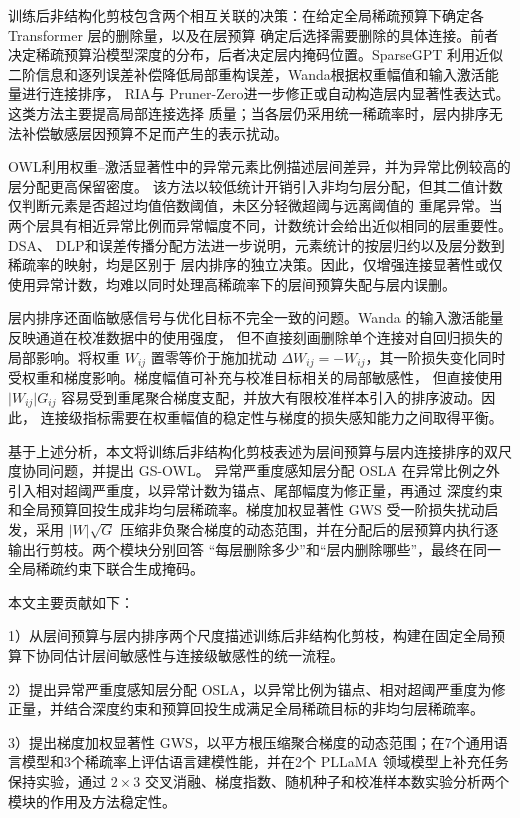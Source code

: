\documentclass[UTF8,fontset=fandol]{ctexart}
\newcommand{\method}{GS-OWL}
\begin{document}
训练后非结构化剪枝包含两个相互关联的决策：在给定全局稀疏预算下确定各 Transformer 层的删除量，以及在层预算
确定后选择需要删除的具体连接。前者决定稀疏预算沿模型深度的分布，后者决定层内掩码位置。SparseGPT\cite{sparsegpt}
利用近似二阶信息和逐列误差补偿降低局部重构误差，Wanda\cite{wanda}根据权重幅值和输入激活能量进行连接排序，
RIA\cite{ria}与 Pruner-Zero\cite{prunerzero}进一步修正或自动构造层内显著性表达式。这类方法主要提高局部连接选择
质量；当各层仍采用统一稀疏率时，层内排序无法补偿敏感层因预算不足而产生的表示扰动。

OWL\cite{owl}利用权重--激活显著性中的异常元素比例描述层间差异，并为异常比例较高的层分配更高保留密度。
该方法以较低统计开销引入非均匀层分配，但其二值计数仅判断元素是否超过均值倍数阈值，未区分轻微超阈与远离阈值的
重尾异常。当两个层具有相近异常比例而异常幅度不同，计数统计会给出近似相同的层重要性。DSA\cite{dsa}、
DLP\cite{dlp}和误差传播分配方法\cite{atp}进一步说明，元素统计的按层归约以及层分数到稀疏率的映射，均是区别于
层内排序的独立决策。因此，仅增强连接显著性或仅使用异常计数，均难以同时处理高稀疏率下的层间预算失配与层内误删。

层内排序还面临敏感信号与优化目标不完全一致的问题。Wanda 的输入激活能量反映通道在校准数据中的使用强度，
但不直接刻画删除单个连接对自回归损失的局部影响。将权重 $W_{ij}$ 置零等价于施加扰动
$\Delta W_{ij}=-W_{ij}$，其一阶损失变化同时受权重和梯度影响。梯度幅值可补充与校准目标相关的局部敏感性，
但直接使用 $\lvert W_{ij}\rvert G_{ij}$ 容易受到重尾聚合梯度支配，并放大有限校准样本引入的排序波动。因此，
连接级指标需要在权重幅值的稳定性与梯度的损失感知能力之间取得平衡。

基于上述分析，本文将训练后非结构化剪枝表述为层间预算与层内连接排序的双尺度协同问题，并提出 \method。
异常严重度感知层分配 OSLA 在异常比例之外引入相对超阈严重度，以异常计数为锚点、尾部幅度为修正量，再通过
深度约束和全局预算回投生成非均匀层稀疏率。梯度加权显著性 GWS 受一阶损失扰动启发，采用
$\lvert W\rvert\sqrt{G}$ 压缩非负聚合梯度的动态范围，并在分配后的层预算内执行逐输出行剪枝。两个模块分别回答
“每层删除多少”和“层内删除哪些”，最终在同一全局稀疏约束下联合生成掩码。

本文主要贡献如下：

1）从层间预算与层内排序两个尺度描述训练后非结构化剪枝，构建在固定全局预算下协同估计层间敏感性与连接级敏感性的统一流程。

2）提出异常严重度感知层分配 OSLA，以异常比例为锚点、相对超阈严重度为修正量，并结合深度约束和预算回投生成满足全局稀疏目标的非均匀层稀疏率。

3）提出梯度加权显著性 GWS，以平方根压缩聚合梯度的动态范围；在7个通用语言模型和3个稀疏率上评估语言建模性能，并在2个 PLLaMA 领域模型上补充任务保持实验，通过 $2\times3$ 交叉消融、梯度指数、随机种子和校准样本数实验分析两个模块的作用及方法稳定性。
\end{document}
